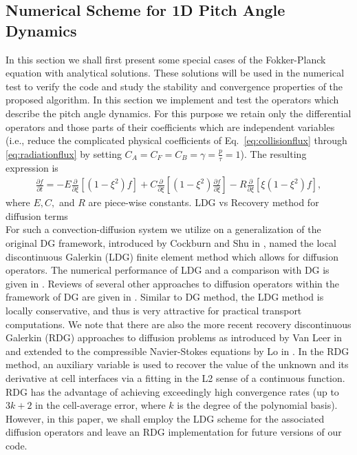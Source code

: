 \documentclass[preprint,11pt]{elsarticle}
\begin{document}
\subsection{Numerical Scheme for 1D Pitch Angle Dynamics}
\label{sec:1D-tests}
In this section we shall first present some special cases of the Fokker-Planck equation with analytical solutions.  These solutions will be used in the numerical test to verify the code and study the stability and convergence properties of the proposed algorithm.
\label{sec:1D-pitch}
%
In this section we implement and test the operators which describe the pitch angle  dynamics. For this purpose we retain only the differential operators and those parts of their coefficients which are independent variables (i.e., reduce the complicated physical coefficients of Eq.~\ref{eq:collisionflux} through \ref{eq:radiationflux} by setting $C_A=C_F=C_B=\gamma=\frac{p}{\tau}=1$). The resulting expression is 
%
\begin{eqnarray}
\label{fullpitchangleeq}
\frac{\partial f}{\partial t}=-E\frac{\partial}{\partial\xi}[(1-\xi^2)f]+C\frac{\partial}{\partial\xi}[(1-\xi^2)\frac{\partial f}{\partial\xi}]-R\frac{\partial}{\partial\xi}[\xi(1-\xi^2)f],
\end{eqnarray}
%
where $E,C,$ and $R$ are piece-wise constants.  
%
{\tiny\color{red} LDG vs Recovery method for diffusion terms\\}
For such a convection-diffusion system we utilize on a generalization of the original DG framework, introduced by  Cockburn and Shu in \cite{CockburnShu1998}, named the local discontinuous Galerkin (LDG) finite element method which allows for diffusion operators. The numerical performance of LDG and a comparison with DG is given in \cite{Castillo2002,Castillo2006}. Reviews of several other approaches to diffusion operators within the framework of DG are given in  \cite{cockburn2001runge,zhang2003analysis}. Similar to DG method, the LDG method is locally conservative, and thus is very attractive for practical transport computations. We note that there are also the more recent recovery discontinuous Galerkin (RDG) approaches to diffusion problems as introduced by Van Leer in \cite{VanLeerNomura2005} and extended to the compressible Navier-Stokes equations by Lo in \cite{LoVanLeer2011}. In the RDG method, an auxiliary variable is used to recover the value of the unknown and its derivative at cell interfaces via a fitting in the L2 sense of a continuous function. RDG has the advantage of achieving exceedingly high convergence rates (up to $3k+2$ in the cell-average error, where $k$ is the degree of the polynomial basis). However, in this paper, we shall employ the LDG scheme for the associated diffusion operators and leave an RDG implementation for future versions of our code.
\end{document}
